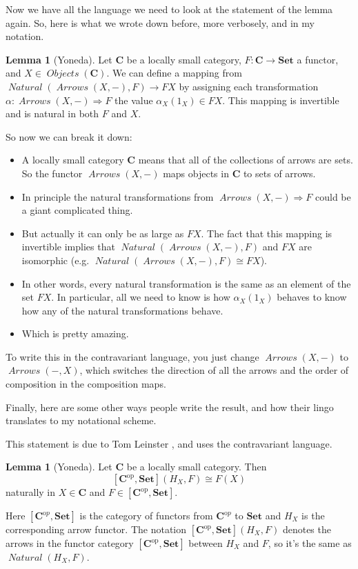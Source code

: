\documentclass[12pt]{article}
\theoremstyle{definition}
\newtheorem{lemma}[thm]{Lemma}
\theoremstyle{definition}
\theoremstyle{definition}
\numberwithin{equation}{section}
\newcommand{\h}{H}                      %
\newcommand{\op}{\mathrm{op}}           %
\newcommand{\ftrcat}[2]{[#1,#2]}                %
\newcommand{\pshf}[1]{\ftrcat{#1^\op}{\Set}}    %
\newcommand{\cat}[1]{\mathbf{#1}}      %
\newcommand{\fcat}[1]{{\mathbf {#1}}}    %
\newcommand{\CC}{\cat{C}}
\newcommand{\CCop}{\cat{C}^{\mathrm op}}
\DeclareMathOperator{\Arrows}{\mathit{Arrows}}
\DeclareMathOperator{\Objects}{\mathit{Objects}}
\DeclareMathOperator{\Nat}{\mathit{Natural}}
\def\objc{\Objects(\cat{C})}
\newcommand{\Set}{\fcat{Set}}           %
\newcommand{\iso}{\cong}                %
\newcommand{\fto}{\Rightarrow}
\def\pg{\bigskip\goodbreak
\ni}
\def\ni{\goodbreak\noindent}
\begin{document}
Now we have all the language we need to look at the statement of the lemma again.
So, here is what we wrote down before, more verbosely, and in my notation.

\begin{lemma}[Yoneda]\label{yoneda} Let $\CC$ be a locally small category, $F:\CC \to \Set$ a functor,
and $X \in \objc$. We can define a mapping from $\Nat(\Arrows(X, -),F) \to FX$
by assigning each transformation $\alpha: \Arrows(X, -) \fto F$ 
the value $\alpha_X(1_X) \in FX$. 
This mapping is invertible and is natural in both $F$ and $X$.
\end{lemma}
\ni
So now we can break it down:
\begin{itemize}
\item A locally small category $\CC$ means that all of the collections of arrows are sets.
So the functor $\Arrows(X,-)$ maps objects in $\CC$ to sets of arrows.
\item In principle the natural transformations 
from $\Arrows(X, -) \fto F$ could be a giant complicated thing.
\item But actually it can only be as large as $FX$. The fact that this mapping is
invertible implies
that $\Nat(\Arrows(X, -),F)$ and  $FX$ are isomorphic (e.g. $\Nat(\Arrows(X, -),F) \iso FX$).
\item In other words, every natural transformation is the same as
an element of the set $FX$. In particular, all we need to know is how 
$\alpha_X(1_X)$ behaves to know
how any of the natural transformations behave.
\item Which is pretty amazing.
\end{itemize}
To write this in the contravariant language, you just change $\Arrows(X, -)$ to $\Arrows(-, X)$, which
switches the direction of all the arrows and the order of composition in the composition maps.

\pg
Finally, here are some other ways people write the result, and how their lingo translates to 
my notational scheme.

\pg
This statement is due to Tom Leinster \cite{Leinster}, and uses the contravariant language.

\begin{lemma}[Yoneda]   
\label{yoneda-leinster}
Let $\CC$ be a locally small category.  Then
%
$$
\pshf{\CC}(\h_X, F)
\iso
F(X)
$$
%
naturally in $X \in \CC$ and $F \in \pshf{\CC}$.  
\end{lemma}
\ni
Here $[\CCop, \Set]$ is the category of functors from $\CCop$ to $\Set$ and $\h_X$ is the corresponding
arrow functor. The notation $\pshf{\CC}(\h_X, F)$ denotes the arrows in the functor category $\pshf{\CC}$ between 
$\h_X$ and $F$, so it's the same as $\Nat(\h_X, F)$.
\end{document}
